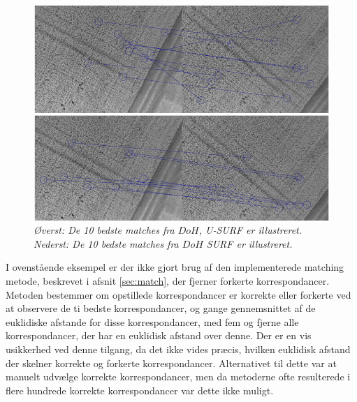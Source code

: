 \begin{figure}[H]
    \centering
    \includegraphics[width=1\textwidth]{fig/rot2.png}
     \vspace{-1em}
    \begin{center} 
       \caption{{\footnotesize \textit{Øverst: De 10 bedste matches fra $DoH$, U-SURF er illustreret. Nederst: De 10 bedste matches fra $DoH$ SURF er illustreret. }}}
    \label{fig:rota}
     \end{center}
     \vspace{-2.5em}
  \end{figure} \noindent
I ovenstående eksempel er der ikke gjort brug af den implementerede matching metode, beskrevet i afsnit \ref{sec:match}, der fjerner forkerte korrespondancer. Metoden bestemmer om opstillede korrespondancer er korrekte eller forkerte ved at observere de ti bedste korrespondancer, og gange gennemsnittet af de euklidiske afstande for disse korrespondancer, med fem og fjerne alle korrespondancer, der har en euklidisk afstand over denne. Der er en vis usikkerhed ved denne tilgang, da det ikke vides præcis, hvilken euklidisk afstand der skelner korrekte og forkerte korrespondancer.  Alternativet til dette var at manuelt udvælge korrekte korrespondancer, men da metoderne ofte resulterede i flere hundrede korrekte korrespondancer var dette ikke muligt.

